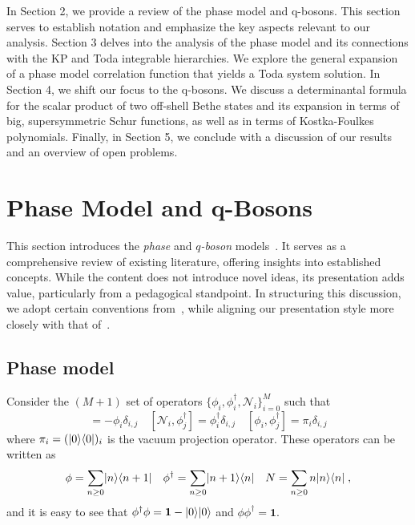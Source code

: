\documentclass[a4paper,11pt]{amsart}
\begin{document}
In Section 2, we provide a review of the phase model and
q-bosons. This section serves to establish notation and emphasize the
key aspects relevant to our analysis.  Section 3 delves into the
analysis of the phase model and its connections with the KP and Toda
integrable hierarchies. We explore the general expansion of a phase
model correlation function that yields a Toda system solution.  In
Section 4, we shift our focus to the q-bosons. We discuss a
determinantal formula for the scalar product of two off-shell Bethe
states and its expansion in terms of big, supersymmetric Schur
functions, as well as in terms of Kostka-Foulkes polynomials.
Finally, in Section 5, we conclude with a discussion of our results
and an overview of open problems.





\section{Phase Model and q-Bosons}

This section introduces the \emph{phase} and \emph{\(q\)-boson}
models~\cite{Bogoliubov:1992, Bogoliubov:1997soj, Bogoliubov2005,
  Tsilevich:2006}. It serves as a comprehensive review of existing
literature, offering insights into established concepts.  While the
content does not introduce novel ideas, its presentation adds value,
particularly from a pedagogical standpoint.  In structuring this
discussion, we adopt certain conventions from~\cite{Wheeler:2010vmq},
while aligning our presentation style more closely with that
of~\cite{Tsilevich:2006}.




\subsection{Phase model}
Consider the \((M+1)\) set of operators \(\{\phi_i,
\phi_i^\dagger,\mathcal{N}_i\}_{i=0}^M\) such that
\begin{equation}
 [\mathcal{N}_i, \phi_j] = - \phi_i \delta_{i,j} \quad
 [\mathcal{N}_i, \phi_j^\dagger] =  \phi_i^\dagger \delta_{i,j}  \quad 
 [\phi_i, \phi_j^\dagger] =  \pi_i \delta_{i,j}  
\end{equation}
where \(\pi_i =(\lvert0\rangle \langle0\rvert)_i\) is the vacuum projection operator.
These operators can be written as
\begin{equation}
\phi = \sum_{n\geq 0}\lvert n\rangle\langle n+1\rvert\quad 
\phi^\dagger = \sum_{n\geq 0}\lvert n+1\rangle\langle n\rvert \quad 
N = \sum_{n\geq 0}n\lvert n\rangle\langle n\rvert\; ,
\end{equation}
and it is easy to see that \(\phi^\dagger \phi = \bm{1} - \lvert0\rangle
\lvert0\rangle\) and \(\phi\phi^\dagger = \bm{1}\).
\end{document}
